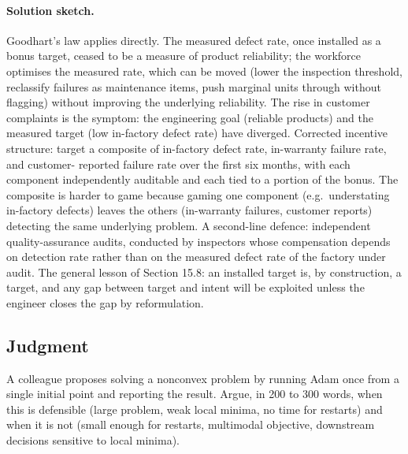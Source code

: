 \paragraph{Solution sketch.}
Goodhart's law applies directly. The measured defect rate, once
installed as a bonus target, ceased to be a measure of product
reliability; the workforce optimises the measured rate, which can
be moved (lower the inspection threshold, reclassify failures as
maintenance items, push marginal units through without flagging)
without improving the underlying reliability. The rise in customer
complaints is the symptom: the engineering goal (reliable
products) and the measured target (low in-factory defect rate)
have diverged. Corrected incentive structure: target a composite
of in-factory defect rate, in-warranty failure rate, and customer-
reported failure rate over the first six months, with each
component independently auditable and each tied to a portion of
the bonus. The composite is harder to game because gaming one
component (e.g.\ understating in-factory defects) leaves the
others (in-warranty failures, customer reports) detecting the same
underlying problem. A second-line defence: independent
quality-assurance audits, conducted by inspectors whose
compensation depends on detection rate rather than on the measured
defect rate of the factory under audit. The general lesson of
Section 15.8: an installed target is, by construction, a target,
and any gap between target and intent will be exploited unless
the engineer closes the gap by reformulation.

\subsection*{Judgment}

\begin{exercise}
A colleague proposes solving a nonconvex problem by running Adam
once from a single initial point and reporting the result.
Argue, in 200 to 300 words, when this is defensible (large
problem, weak local minima, no time for restarts) and when it is
not (small enough for restarts, multimodal objective, downstream
decisions sensitive to local minima).
\end{exercise}

